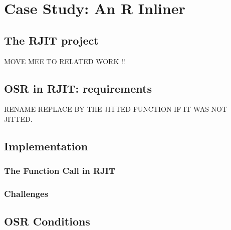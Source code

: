 
\chapter{Case Study: An R Inliner} %

\label{Chapter5} %


\newcommand{\keyword}[1]{\textbf{#1}}
\newcommand{\tabhead}[1]{\textbf{#1}}
\newcommand{\code}[1]{\texttt{#1}}
\newcommand{\file}[1]{\texttt{\bfseries#1}}
\newcommand{\option}[1]{\texttt{\itshape#1}}


\section{The RJIT project}
MOVE MEE TO RELATED WORK !!\\
\section{OSR in RJIT: requirements}
RENAME
REPLACE BY THE JITTED FUNCTION IF IT WAS NOT JITTED.
\section{Implementation}
\subsection{The Function Call in RJIT}
\subsection{Challenges}
\section{OSR Conditions}
